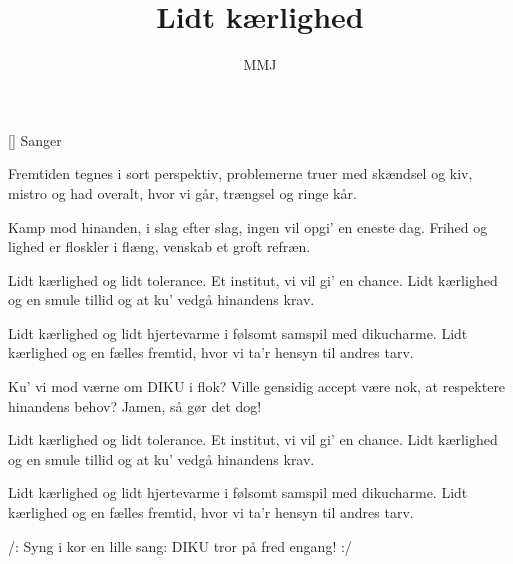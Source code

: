 \documentclass[a4paper,11pt]{article}
\title{Lidt kærlighed}
\author{MMJ}
\begin{document}
\maketitle

\begin{roles}
[] Sanger 
\end{roles}

\begin{song}
   Fremtiden tegnes i sort perspektiv,
            problemerne truer med skændsel og kiv,
            mistro og had overalt, hvor vi går,
            trængsel og ringe kår.

   Kamp mod hinanden, i slag efter slag,
            ingen vil opgi' en eneste dag.
            Frihed og lighed er floskler i flæng,
            venskab et groft refræn.

   Lidt kærlighed og lidt tolerance.
            Et institut, vi vil gi' en chance.
            Lidt kærlighed og en smule tillid
            og at ku' vedgå hinandens krav.

   Lidt kærlighed og lidt hjertevarme
            i følsomt samspil med dikucharme.
            Lidt kærlighed og en fælles fremtid,
            hvor vi ta'r hensyn til andres tarv.

   Ku' vi mod værne om DIKU i flok?
            Ville gensidig accept være nok,
            at respektere hinandens behov?
            Jamen, så gør det dog!

   Lidt kærlighed og lidt tolerance.
            Et institut, vi vil gi' en chance.
            Lidt kærlighed og en smule tillid
            og at ku' vedgå hinandens krav.

    Lidt kærlighed og lidt hjertevarme
            i følsomt samspil med dikucharme.
            Lidt kærlighed og en fælles fremtid,
            hvor vi ta'r hensyn til andres tarv.

   /: Syng i kor
            en lille sang:
            DIKU tror
            på fred engang! :/

\end{song}
\end{document}
